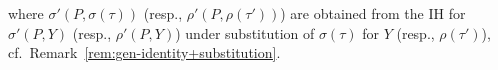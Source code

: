 \begin{definition}
\begin{itemize}
\[{{{        }
        }
        }
        \]
        where $\sigma'(P,\sigma(\tau))$ (resp., $\rho'(P,\rho(\tau'))$) are obtained from the IH for $\sigma'(P,Y)$ (resp., $\rho'(P,Y)$) under substitution of $\sigma(\tau)$ for $Y$ (resp., $\rho(\tau')$), cf.~Remark~\ref{rem:gen-identity+substitution}.
        \end{itemize}
\end{definition}

